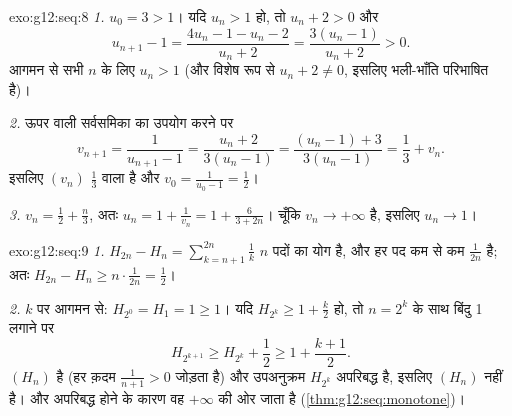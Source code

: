 \begin{solution}{exo:g12:seq:8}
\emph{1.} $u_0 = 3 > 1$। यदि $u_n > 1$ हो, तो $u_n + 2 > 0$ और
\[
u_{n+1} - 1 = \frac{4u_n - 1 - u_n - 2}{u_n + 2} = \frac{3(u_n - 1)}{u_n + 2} > 0 .
\]
आगमन से सभी $n$ के लिए $u_n > 1$ (और विशेष रूप से $u_n + 2 \neq 0$, इसलिए  भली-भाँति
परिभाषित है)।

\emph{2.} ऊपर वाली सर्वसमिका का उपयोग करने पर
\[
v_{n+1} = \frac{1}{u_{n+1} - 1} = \frac{u_n + 2}{3(u_n - 1)}
= \frac{(u_n - 1) + 3}{3(u_n - 1)} = \frac{1}{3} + v_n .
\]
इसलिए $(v_n)$  $\frac13$ वाला  है और $v_0 = \frac{1}{u_0 - 1} = \frac12$।

\emph{3.} $v_n = \frac12 + \frac{n}{3}$, अतः $u_n = 1 + \frac{1}{v_n} = 1 + \frac{6}{3 + 2n}$। चूँकि $v_n \to +\infty$ है, इसलिए $u_n \to 1$।
\end{solution}

\begin{solution}{exo:g12:seq:9}
\emph{1.} $H_{2n} - H_n = \sum_{k=n+1}^{2n} \frac{1}{k}$ $n$ पदों का योग है, और हर पद कम से कम $\frac{1}{2n}$ है; अतः $H_{2n} - H_n \geq n \cdot \frac{1}{2n} = \frac12$।

\emph{2.} $k$ पर आगमन से: $H_{2^0} = H_1 = 1 \geq 1$। यदि $H_{2^k} \geq 1 + \frac{k}{2}$ हो, तो $n = 2^k$ के साथ बिंदु 1
लगाने पर
\[
H_{2^{k+1}} \geq H_{2^k} + \frac12 \geq 1 + \frac{k+1}{2}.
\]
 $(H_n)$  है (हर क़दम $\frac{1}{n+1} > 0$ जोड़ता है) और उपअनुक्रम $H_{2^k}$
अपरिबद्ध है, इसलिए $(H_n)$  नहीं है।  और अपरिबद्ध होने के
कारण वह $+\infty$ की ओर जाता है (\cref{thm:g12:seq:monotone})।
\end{solution}

